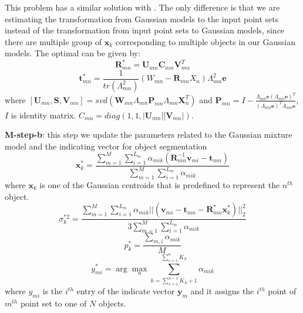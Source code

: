 This problem has a similar solution with \cite{Evangelidis2014}. 
The only difference is that we are estimating the transformation from Gaussian models to the input point sets instead of the transformation from input point sets to Gaussian models, since there are multiple group of $\pmb{x}_k$ corresponding to multiple objects in our Gaussian models. The optimal can be given by:
%
\begin{equation}
\label{equ:updateR}
\mathbf{R}_{mn}^*=\mathbf{U}_{mn}\mathbf{C}_{mn}\mathbf{V}_{mn}^T
\end{equation}
\begin{equation}
\label{equ:updatet}
\pmb{t}_{mn}^*=\frac{1}{tr(\Lambda_{mn}^2)}(W_{mn}-\mathbf{R}_{mn}X_n)\Lambda_{mn}^2\mathbf{e}
\end{equation}
where $[\mathbf{U}_{mn},\mathbf{S},\mathbf{V}_{mn}]=svd( \mathbf{W}_{mn}\Lambda_{mn}\mathbf{P}_{mn}\Lambda_{mn}\mathbf{X}_{n}^T )$ and $\mathbf{P}_{mn}=I-\frac{\Lambda_{mn}\pmb{e}(\Lambda_{mn}\pmb{e})^T}{(\Lambda_{mn}\pmb{e})^T\Lambda_{mn}\pmb{e}}$, $I$ is identity matrix. $C_{mn}=diag(1,1,|\mathbf{U}_{mn}||\mathbf{V}_{mn}|)$.

\textbf{M-step-b}: this step we update the parameters related to the Gaussian mixture model and the indicating vector for object segmentation 
\begin{equation}
\label{equ:updatexk}
\pmb x_k^*=\frac{\sum_{m=1}^M\sum_{i=1}^{L_m}\alpha_{mik}(\mathbf{R}_{mn}^{-1}\pmb{v}_{mi}-\pmb t_{mn})}{\sum_{m=1}^M\sum_{i=1}^{L_m}\alpha_{mik}}
\end{equation}
where $\pmb{x}_k$ is one of the Gaussian centroids that is predefined to represent the $n^{th}$ object. 
\begin{equation}
\label{equ:updatesigma}
\sigma_k^{*2}=\frac{\sum_{m=1}^M\sum_{i=1}^{L_m}\alpha_{mik}||(\pmb{v}_{mi}-\pmb t_{mn}-\mathbf{R}_{mn}^*\pmb x_k^*)||_2^2}{3\sum_{m=1}^M\sum_{i=1}^{L_m}\alpha_{mik}}
\end{equation}
\begin{equation}
\label{equ:updatepk}
p_k^*=\frac{\sum_{m,i}\alpha_{mik}}{M}
\end{equation}
\begin{equation}
\label{equ:updatey}
y_{mi}^*=\arg \max_n \sum_{k=\sum_{s=1}^{n-1}K_S+1}^{\sum_{s=1}^{n}K_S} \alpha_{mik} 
\end{equation}
where $y_{mi}$ is the $i^{th}$ entry of the indicate vector $\pmb{y}_{m}$ and it assigns the $i^{th}$ point of $m^{th}$ point set to one of $N$ objects.  
